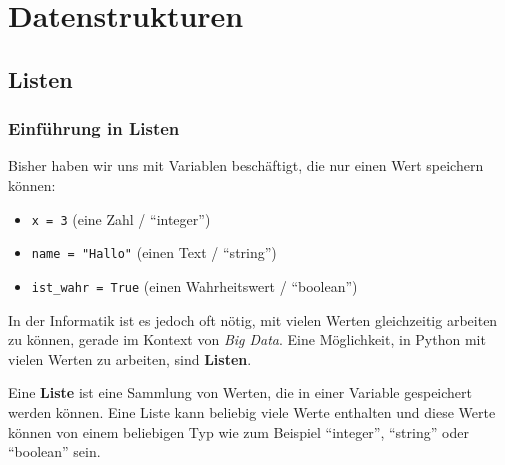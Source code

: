\chapter{Datenstrukturen}\label{ch:K06_Datenstrukturen}
\section{Listen}
\subsection{Einführung in Listen}
Bisher haben wir uns mit Variablen beschäftigt, die nur einen Wert speichern können:
\begin{itemize}
	\item \lstinline|x = 3| (eine Zahl / \enquote{integer})
	\item \lstinline|name = "Hallo"| (einen Text /  \enquote{string})
	\item \lstinline|ist_wahr = True| (einen Wahrheitswert / \enquote{boolean})
\end{itemize}

In der Informatik ist es jedoch oft nötig, mit vielen Werten gleichzeitig arbeiten zu können, gerade im Kontext von \textit{Big Data}. Eine Möglichkeit, in Python mit vielen Werten zu arbeiten, sind \textbf{Listen}.

\begin{mydefinition}[Liste]
	Eine \textbf{Liste} ist eine Sammlung von Werten, die in einer Variable gespeichert werden können. Eine Liste kann beliebig viele Werte enthalten und diese Werte können von einem beliebigen Typ wie zum Beispiel \enquote{integer}, \enquote{string} oder \enquote{boolean} sein.
\end{mydefinition}

